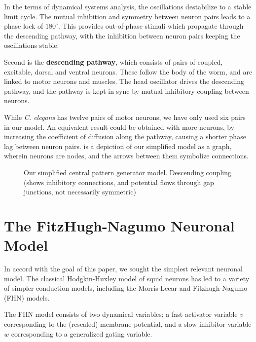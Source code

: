 \documentclass[
    11pt,
]{article}
\begin{document}
In the terms of dynamical systems analysis, the oscillations destabilize to a stable limit cycle.  The mutual inhibition and symmetry between neuron pairs leads to a phase lock of $180^\circ$.  This provides out-of-phase stimuli which propagate through the descending pathway, with the inhibition between neuron pairs keeping the oscillations stable.

Second is the \textbf{descending pathway}, which consists of pairs of coupled, excitable, dorsal and ventral neurons.  These follow the body of the worm, and are linked to motor neurons and muscles.  The head oscillator drives the descending pathway, and the pathway is kept in sync by mutual inhibitory coupling between neurons.

While \textit{C. elegans} has twelve pairs of motor neurons, we have only used six pairs in our model.  An equivalent result could be obtained with more neurons, by increasing the coefficient of diffusion along the pathway, causing a shorter phase lag between neuron pairs.   is a depiction of our simplified model as a graph, wherein neurons are nodes, and the arrows between them symbolize connections.

\begin{figure}[h!]
    \ContinuedFloat
    \centering
    \caption{Our simplified central pattern generator model.  Descending coupling (shows inhibitory connections, and potential flows through gap junctions, not necessarily symmetric)}
    \label{fig: cpg}
\end{figure} %

\section{The FitzHugh-Nagumo Neuronal Model}\label{sec: fhn}

In accord with the goal of this paper, we sought the simplest relevant neuronal model.  The classical Hodgkin-Huxley\cite{hodgkin1952} model of squid neurons has led to a variety of simpler conduction models, including the Morris-Lecar\cite{morris1981} and Fitzhugh-Nagumo (FHN) models.

The FHN model consists of two dynamical variables; a fast activator variable $v$ corresponding to the (rescaled) membrane potential, and a slow inhibitor variable $w$ corresponding to a generalized gating variable.
\end{document}
